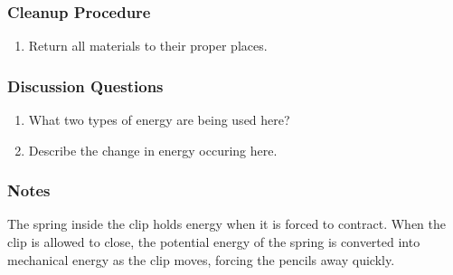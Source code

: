 \subsubsection*{Cleanup Procedure}
\begin{enumerate}
\item{Return all materials to their proper places.}
\end{enumerate}

\subsubsection*{Discussion Questions}
\begin{enumerate}
\item{What two types of energy are being used here?}
\item{Describe the change in energy occuring here.}
\end{enumerate}
 
\subsubsection{Notes}
The spring inside the clip holds energy when it is forced to contract.  
When the clip is allowed to close, the potential energy of the spring
is converted into mechanical energy as the clip moves, forcing the pencils
away quickly.